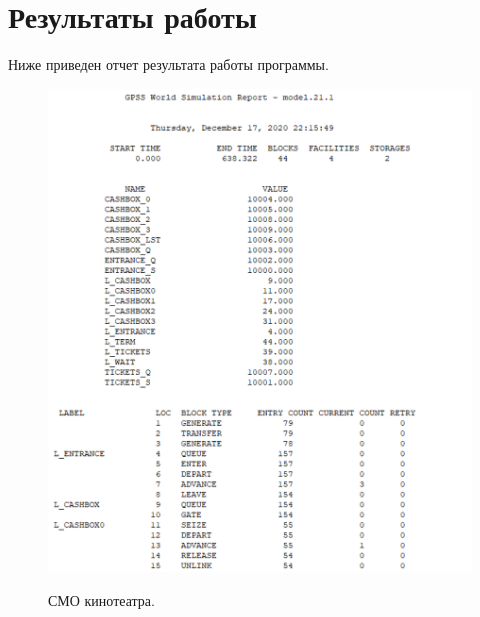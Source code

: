 \documentclass[a4paper,12pt]{article}
\begin{document}
	\newpage
	
	\section*{Результаты работы}
	
	Ниже приведен отчет результата работы программы.
	
	\begin{figure}[h!]
		\begin{center}
			{\includegraphics[scale = 0.6]{1.png}}
			\label{ris:smo1}
		\end{center}
		\caption{СМО кинотеатра.}
	\end{figure}
	
	\newpage
	
\end{document}
